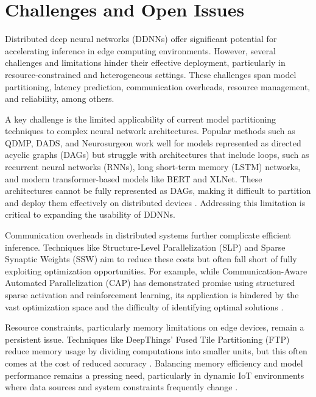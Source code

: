 \documentclass[conference]{IEEEtran}
\begin{document}



\section{Challenges and Open Issues}

Distributed deep neural networks (DDNNs) offer significant potential for accelerating inference in edge computing environments. However, several challenges and limitations hinder their effective deployment, particularly in resource-constrained and heterogeneous settings. These challenges span model partitioning, latency prediction, communication overheads, resource management, and reliability, among others.

A key challenge is the limited applicability of current model partitioning techniques to complex neural network architectures. Popular methods such as QDMP, DADS, and Neurosurgeon work well for models represented as directed acyclic graphs (DAGs) but struggle with architectures that include loops, such as recurrent neural networks (RNNs), long short-term memory (LSTM) networks, and modern transformer-based models like BERT and XLNet. These architectures cannot be fully represented as DAGs, making it difficult to partition and deploy them effectively on distributed devices \cite{zhang2021dynamic, zhao2018deepthings, zhou2021dynamic}. Addressing this limitation is critical to expanding the usability of DDNNs.

Communication overheads in distributed systems further complicate efficient inference. Techniques like Structure-Level Parallelization (SLP) and Sparse Synaptic Weights (SSW) aim to reduce these costs but often fall short of fully exploiting optimization opportunities. For example, while Communication-Aware Automated Parallelization (CAP) has demonstrated promise using structured sparse activation and reinforcement learning, its application is hindered by the vast optimization space and the difficulty of identifying optimal solutions \cite{zou2021cap}.

Resource constraints, particularly memory limitations on edge devices, remain a persistent issue. Techniques like DeepThings' Fused Tile Partitioning (FTP) reduce memory usage by dividing computations into smaller units, but this often comes at the cost of reduced accuracy \cite{zhao2018deepthings}. Balancing memory efficiency and model performance remains a pressing need, particularly in dynamic IoT environments where data sources and system constraints frequently change \cite{mohammed2020distributed, naveen2021low}.
\end{document}
